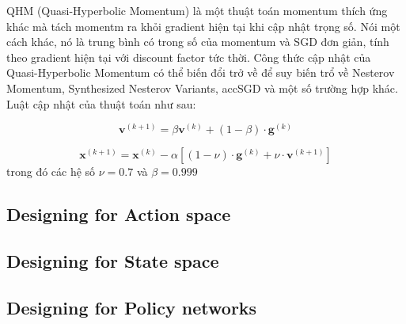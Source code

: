 QHM (Quasi-Hyperbolic Momentum) là một thuật toán momentum thích ứng khác mà tách momentm ra khỏi gradient hiện tại khi cập nhật trọng số. Nói một cách khác, nó là trung bình có trong số của momentum và SGD đơn giản, tính theo gradient hiện tại với discount factor tức thời. Công thức cập nhật của Quasi-Hyperbolic Momentum có thể biến đổi trở về để suy biến trổ về Nesterov Momentum, Synthesized Nesterov Variants, accSGD và một số trường hợp khác. Luật cập nhật của thuật toán như sau:

\begin{equation}
    \mathbf{v}^{(k+1)} = \beta\mathbf{v}^{(k)} + (1-\beta) \cdot \mathbf{g}^{(k)}
\end{equation}

\begin{equation}
    \mathbf{x}^{(k+1)} = \mathbf{x}^{(k)} - \alpha \left[(1-\nu) \cdot \mathbf{g}^{(k)} + \nu \cdot \mathbf{v}^{(k+1)}\right]
\end{equation}
trong đó các hệ số $\nu = 0.7$ và $\beta = 0.999$

\subsection{Designing for Action space}

\subsection{Designing for State space}

\subsection{Designing for Policy networks}
